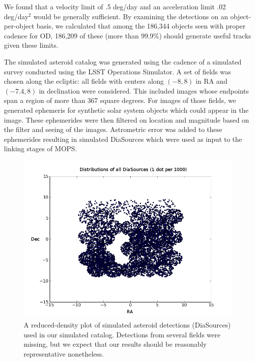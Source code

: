 \documentclass[12pt,preprint]{aastex}
\begin{document}
We found that a velocity limit of .5 deg/day and an acceleration limit
.02 deg/day$^2$ would be generally sufficient.  By examining the
detections on an object-per-object basis, we calculated that among the
186,344 objects seen with proper cadence for OD, 186,209 of these
(more than 99.9\%) should generate useful tracks given these limits.



\label{sourceCatalog}
The simulated asteroid catalog was generated using the cadence of a
simulated survey conducted using the LSST Operations Simulator.  A set
of fields was chosen along the ecliptic: all fields with centers along
$(-8, 8)$ in RA and $(-7.4, 8)$ in declination were considered.  This
included images whose endpoints span a region of more than 367 square
degrees. For images of those fields, we generated ephemeris for
synthetic solar system objects which could appear in the image.  These
ephemerides were then filtered on location and magnitude based on the
filter and seeing of the images.  Astrometric error was added to these
ephemerides resulting in simulated DiaSources which were used as input
to the linking stages of MOPS.


\begin{figure}[ht!]
\centering
\includegraphics[scale=.7]{illustrations/allDias_1_1000th_density.png}
\caption{A reduced-density plot of simulated asteroid detections (DiaSources) used in our simulated catalog.  Detections from several fields were missing, but we expect that our results should be reasonably representative nonetheless.}
\label{diasPlot}
\end{figure}
\end{document}
